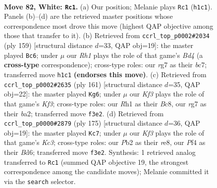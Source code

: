 \documentclass[11pt]{article}
\begin{document}
\clearpage

\begin{figure}[p]\centering
\begin{subfigure}{0.46\textwidth}\centering
\resizebox{\linewidth}{!}{%
\newchessgame
\chessboard[
  setfen={8/6r1/p2k4/Ppp2p1p/2p2P1P/4PKP1/1P6/7R w - - 9 82},
  showmover=false,
  pgfstyle=straightmove, color=movearrow, markmove={h1-c1}
]}
\caption{}
\end{subfigure}\hfill
\begin{subfigure}{0.46\textwidth}\centering
\resizebox{\linewidth}{!}{%
\newchessgame
\chessboard[
  setfen={8/2B5/8/1p1b2pk/p4p1p/P4P1P/1P4P1/6K1 b - - 5 80},
  showmover=false,
  pgfstyle=straightmove, color=movearrow, markmove={d5-c6}
]}
\caption{}
\end{subfigure}
\\[4pt]
\begin{subfigure}{0.46\textwidth}\centering
\resizebox{\linewidth}{!}{%
\newchessgame
\chessboard[
  setfen={2b5/8/2P1pk2/1p1p1p2/1P1P1P2/p3P2P/B7/7K b - - 19 81},
  showmover=false,
  pgfstyle=straightmove, color=movearrow, markmove={f6-g6}
]}
\caption{}
\end{subfigure}\hfill
\begin{subfigure}{0.46\textwidth}\centering
\resizebox{\linewidth}{!}{%
\newchessgame
\chessboard[
  setfen={4R3/r5p1/2kb1p1p/p1p2P1P/P1P5/1PB5/2K5/8 b - - 16 88},
  showmover=false,
  pgfstyle=straightmove, color=movearrow, markmove={c6-c7}
]}
\caption{}
\end{subfigure}
\caption{\textbf{Move 82, White: \texttt{Rc1}.} (a) Our position; Melanie plays \texttt{Rc1} (\texttt{h1c1}). Panels (b)--(d) are the retrieved master positions whose correspondence most drove this move (highest QAP objective among those that transfer to it). (b) Retrieved from \texttt{ccrl\_top\_p0002\#2034} (ply 159) [structural distance $d$=33, QAP obj=19]: the master played \texttt{Bc6}; under $\mu$ our \emph{Rh1} plays the role of that game's \emph{Bd4} (a \textbf{cross-type} correspondence); cross-type roles: our \emph{r}g7 as their \emph{b}c7; transferred move \texttt{h1c1} \textbf{(endorses this move)}. (c) Retrieved from \texttt{ccrl\_top\_p0002\#2635} (ply 161) [structural distance $d$=35, QAP obj=22]: the master played \texttt{Kg6}; under $\mu$ our \emph{Kf3} plays the role of that game's \emph{Kf3}; cross-type roles: our \emph{R}h1 as their \emph{B}c8, our \emph{r}g7 as their \emph{b}a2; transferred move \texttt{f3e2}. (d) Retrieved from \texttt{ccrl\_top\_p0000\#2879} (ply 175) [structural distance $d$=36, QAP obj=19]: the master played \texttt{Kc7}; under $\mu$ our \emph{Kf3} plays the role of that game's \emph{Kc3}; cross-type roles: our \emph{P}b2 as their \emph{r}e8, our \emph{P}f4 as their \emph{B}d6; transferred move \texttt{f3e2}. Synthesis: 1 retrieved analog transferred to \texttt{Rc1} (summed QAP objective 19, the strongest correspondence among the candidate moves); Melanie committed it via the \texttt{search} selector.}
\label{fig:thought-m162}
\end{figure}
\end{document}
